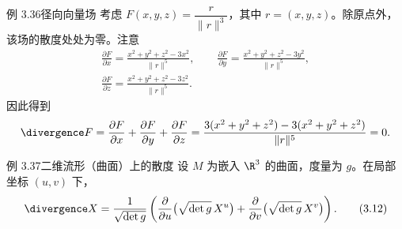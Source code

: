 \begin{statement}{例 3.36}{径向向量场}
考虑 $F(x,y,z)=\dfrac{r}{\lVert r\rVert^3}$，其中 $r=(x,y,z)$。除原点外，该场的散度处处为零。注意
\begin{gather*}
  \frac{\partial F}{\partial x}=\frac{x^2+y^2+z^2-3x^2}{\lVert r\rVert^5},
  \qquad
  \frac{\partial F}{\partial y}=\frac{x^2+y^2+z^2-3y^2}{\lVert r\rVert^5},\\
  \frac{\partial F}{\partial z}=\frac{x^2+y^2+z^2-3z^2}{\lVert r\rVert^5}.
\end{gather*}
因此得到%
%
\[
  \divergence F=\frac{\partial F}{\partial x}+\frac{\partial F}{\partial y}
    +\frac{\partial F}{\partial z}
   =\frac{3(x^2+y^2+z^2)-3(x^2+y^2+z^2)}{\lVert r\rVert^5}=0.
\]
\end{statement}

\begin{statement}{例 3.37}{二维流形（曲面）上的散度}
设 $M$ 为嵌入 $\R^3$ 的曲面，度量为 $g$。在局部坐标 $(u,v)$ 下，
\begin{equation*}
  \divergence X=\frac{1}{\sqrt{\det g}}
    \left(\frac{\partial}{\partial u}\bigl(\sqrt{\det g}\,X^u\bigr)
    +\frac{\partial}{\partial v}\bigl(\sqrt{\det g}\,X^v\bigr)\right).
  \tag{3.12}\label{eq:3.12}
\end{equation*}
\end{statement}

